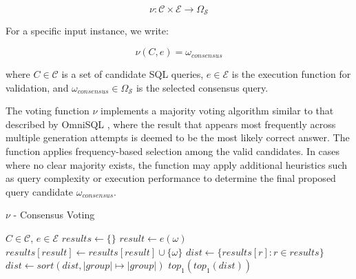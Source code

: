 $$
\nu: \mathcal{C} \times \mathcal{E} \rightarrow \Omega_{\mathcal{S}}
$$

\vspace{0.5em}

For a specific input instance, we write:

$$
\nu(C, e) = \omega_{consensus}
$$

where $C \in \mathcal{C}$ is a set of candidate SQL queries, $e \in \mathcal{E}$ is
the execution function for validation, and $\omega_{consensus} \in \Omega_{\mathcal{S}}$
is the selected consensus query.

\vspace{0.5em}

The voting function $\nu$ implements a majority voting algorithm similar to that
described by OmniSQL \citep{OmniSQL}, where the result that appears most frequently
across multiple generation attempts is deemed to be the most likely correct answer.
The function applies frequency-based selection among the valid candidates. In cases where
no clear majority exists, the function may apply additional heuristics such as query
complexity or execution performance to determine the final proposed query candidate $\omega_{consensus}$.

\begin{algorithm}
\caption{$\nu$ - Consensus Voting}\label{algorithms:nu}
\begin{algorithmic}[1]
\Require $C \in \mathcal{C}$, $e \in \mathcal{E}$
\State $results \gets \{\}$                               
                                      
    \State $result \gets e(\omega)$                       
    \State $results[result] \gets results[result] \cup \{\omega\}$
\EndFor
\State $dist \gets \{results[r] : r \in results\}$        
\State $dist \gets sort(dist, |group| \mapsto |group|)$   
\State \Return $top_1(top_1(dist))$                       
\end{algorithmic}
\end{algorithm}
